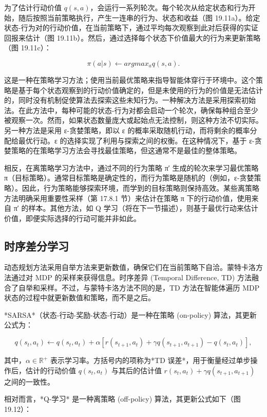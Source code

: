 为了估计行动价值 \(q(s, a)\)，会运行一系列轮次。每个轮次从给定状态和行为开始，随后按照当前策略执行，产生一连串的行为、状态和收益（图 19.11a）。给定状态-行为对的行动价值，在当前策略下，通过平均每次观察到此对后获得的实证回报来估计（图 19.11b）。然后，通过选择每个状态下价值最大的行为来更新策略（图 19.11c）：

\[
\pi(a|s) \leftarrow argmax_a q(s, a). \tag{19.13}
\]

这是一种在策略学习方法；使用当前最优策略来指导智能体穿行于环境中。这个策略是基于每个状态观察到的行动价值确定的，但是未使用的行为的价值是无法估计的，同时没有机制促使算法去探索这些未知行为。一种解决方法是采用探索初始法。在此方法中，每种可能的状态-行为对都会启动一个轮次，确保每种组合至少被观察一次。然而，如果状态数量庞大或起始点无法控制，则这种方法不切实际。另一种方法是采用 ε-贪婪策略，即以 ε 的概率采取随机行动，而将剩余的概率分配给最优行动。ε 的选择实现了利用与探索之间的权衡。在这种情况下，基于 ε-贪婪策略的在策略学习方法会寻找最佳策略，但这通常不是最佳的整体策略。

相反，在离策略学习方法中，通过不同的行为策略 π′ 生成的轮次来学习最优策略 π（目标策略）。通常目标策略是确定性的，而行为策略是随机的（例如，ε-贪婪策略）。因此，行为策略能够探索环境，而学到的目标策略则保持高效。某些离策略方法明确采用重要性采样（第 17.8.1 节）来估计在策略 π 下的行动价值，使用来自 π′ 的样本。其他方法，如 Q 学习（将在下一节描述），则基于最优行动来估计价值，即便实际选择的行动可能并非如此。

\subsection{时序差分学习}
动态规划方法采用自举方法来更新数值，确保它们在当前策略下自洽。蒙特卡洛方法通过对 MDP 的采样来获得信息。时序差异 (Temporal Difference, TD) 方法融合了自举和采样。不过，与蒙特卡洛方法不同的是，TD 方法在智能体遍历 MDP 状态的过程中就更新数值和策略，而不是之后。

*SARSA*（状态-行动-奖励-状态-行动）是一种在策略 (on-policy) 算法，其更新公式为：

\[
q(s_t, a_t) \leftarrow q(s_t, a_t) + \alpha \left[ r(s_{t+1}, a_t) + \gamma q(s_{t+1}, a_{t+1}) - q(s_t, a_t) \right], \tag{19.14}
\]

其中，\(\alpha \in \mathbb{R}^+\) 表示学习率。方括号内的项称为*TD 误差*，用于衡量经过单步操作后，估计的行动价值 \(q(s_t, a_t)\) 与其后的估计值 \(r(s_t, a_t)+\gamma q(s_{t+1}, a_{t+1})\) 之间的一致性。

相对而言，*Q-学习* 是一种离策略 (off-policy) 算法，其更新公式如下（图 19.12）：

